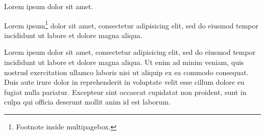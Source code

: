 \documentclass{article}
\begin{document}
\begin{multipagebox}
Lorem ipsum dolor sit amet.
\end{multipagebox}

\begin{multipagebox}
Lorem ipsum\footnote{Footnote inside multipagebox. }%
 dolor sit amet, consectetur adipisicing elit, sed do
eiusmod tempor incididunt ut labore et dolore magna aliqua.
\end{multipagebox}

Lorem ipsum dolor sit amet, consectetur adipisicing elit, sed do
eiusmod tempor incididunt ut labore et dolore magna aliqua. Ut enim ad
minim veniam, quis nostrud exercitation ullamco laboris nisi ut
aliquip ex ea commodo consequat. Duis aute irure dolor in
reprehenderit in voluptate velit esse cillum dolore eu fugiat nulla
pariatur. Excepteur sint occaecat cupidatat non proident, sunt in
culpa qui officia deserunt mollit anim id est laborum.
\end{document}

